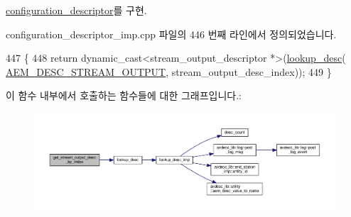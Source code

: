 \hyperlink{classavdecc__lib_1_1configuration__descriptor_a300ea5957342e2e9579318135da02856}{configuration\+\_\+descriptor}를 구현.



configuration\+\_\+descriptor\+\_\+imp.\+cpp 파일의 446 번째 라인에서 정의되었습니다.


\begin{DoxyCode}
447 \{
448     \textcolor{keywordflow}{return} \textcolor{keyword}{dynamic\_cast<}stream\_output\_descriptor *\textcolor{keyword}{>}(\hyperlink{classavdecc__lib_1_1configuration__descriptor__imp_a265e068ed32f7c3694417ffe2c382309}{lookup\_desc}(
      \hyperlink{namespaceavdecc__lib_ac7b7d227e46bc72b63ee9e9aae15902fa3e5e9421e49598854000feaa2fe71464}{AEM\_DESC\_STREAM\_OUTPUT}, stream\_output\_desc\_index));
449 \}
\end{DoxyCode}


이 함수 내부에서 호출하는 함수들에 대한 그래프입니다.\+:
\nopagebreak
\begin{figure}[H]
\begin{center}
\leavevmode
\includegraphics[width=350pt]{classavdecc__lib_1_1configuration__descriptor__imp_a3a72ee92a9eb884f3b71077e48a44b6d_cgraph}
\end{center}
\end{figure}


